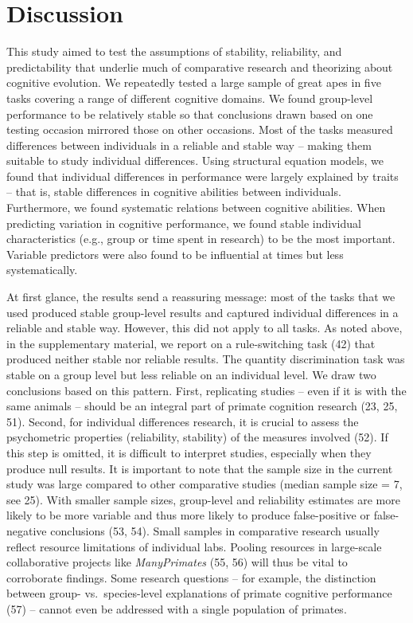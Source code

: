 \documentclass[
  man,floatsintext]{apa6}
\begin{document}
\hypertarget{discussion}{%
\section{Discussion}\label{discussion}}

This study aimed to test the assumptions of stability, reliability, and predictability that underlie much of comparative research and theorizing about cognitive evolution. We repeatedly tested a large sample of great apes in five tasks covering a range of different cognitive domains. We found group-level performance to be relatively stable so that conclusions drawn based on one testing occasion mirrored those on other occasions. Most of the tasks measured differences between individuals in a reliable and stable way -- making them suitable to study individual differences. Using structural equation models, we found that individual differences in performance were largely explained by traits -- that is, stable differences in cognitive abilities between individuals. Furthermore, we found systematic relations between cognitive abilities. When predicting variation in cognitive performance, we found stable individual characteristics (e.g., group or time spent in research) to be the most important. Variable predictors were also found to be influential at times but less systematically.

At first glance, the results send a reassuring message: most of the tasks that we used produced stable group-level results and captured individual differences in a reliable and stable way. However, this did not apply to all tasks. As noted above, in the supplementary material, we report on a rule-switching task (42) that produced neither stable nor reliable results. The quantity discrimination task was stable on a group level but less reliable on an individual level. We draw two conclusions based on this pattern. First, replicating studies -- even if it is with the same animals -- should be an integral part of primate cognition research (23, 25, 51). Second, for individual differences research, it is crucial to assess the psychometric properties (reliability, stability) of the measures involved (52). If this step is omitted, it is difficult to interpret studies, especially when they produce null results. It is important to note that the sample size in the current study was large compared to other comparative studies (median sample size = 7, see 25). With smaller sample sizes, group-level and reliability estimates are more likely to be more variable and thus more likely to produce false-positive or false-negative conclusions (53, 54). Small samples in comparative research usually reflect resource limitations of individual labs. Pooling resources in large-scale collaborative projects like \emph{ManyPrimates} (55, 56) will thus be vital to corroborate findings. Some research questions -- for example, the distinction between group- vs.~species-level explanations of primate cognitive performance (57) -- cannot even be addressed with a single population of primates.
\end{document}
